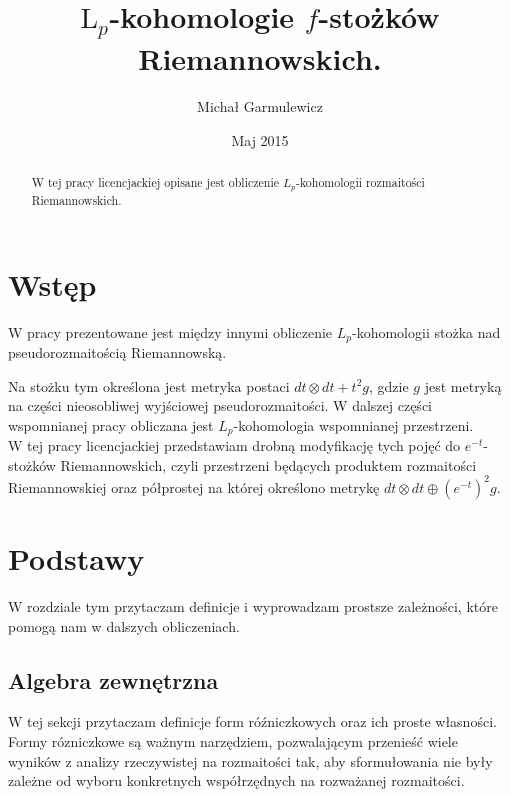 \documentclass[licencjacka]{pracamgr}
\author{Michał Garmulewicz}
\title{$\mathrm{L}_p$-kohomologie $f$-stożków Riemannowskich.}
\date{Maj 2015}
\theoremstyle{definition}
\theoremstyle{definition}
\theoremstyle{plain}
\theoremstyle{plain}
\begin{document}
\maketitle

\begin{abstract}
  W tej pracy licencjackiej opisane jest obliczenie $L_p$-kohomologii
  rozmaitości Riemannowskich.
\end{abstract}

\tableofcontents

\chapter{Wstęp}

W pracy \cite{weber} prezentowane jest między innymi obliczenie
$L_p$-kohomologii stożka nad pseudorozmaitością Riemannowską. 

Na stożku tym określona jest metryka postaci
$dt \otimes dt + t^2 g$, gdzie $g$ 
jest metryką na części nieosobliwej wyjściowej pseudorozmaitości.
W dalszej części wspomnianej pracy obliczana jest $L_p$-kohomologia
wspomnianej przestrzeni.
\\


W tej pracy licencjackiej przedstawiam drobną modyfikację tych pojęć do
$e^{-t}$-stożków Riemannowskich, czyli przestrzeni będących produktem
rozmaitości Riemannowskiej oraz półprostej na której określono metrykę
$dt \otimes dt \oplus (e^{-t})^2 g$. \\


\chapter{Podstawy}
W rozdziale tym przytaczam definicje i wyprowadzam prostsze zależności, które
pomogą nam w dalszych obliczeniach. \\


\section{Algebra zewnętrzna}
W tej sekcji przytaczam definicje form róźniczkowych oraz ich proste
własności. Formy rózniczkowe są ważnym narzędziem, pozwalającym
przenieść wiele wyników z analizy rzeczywistej na rozmaitości tak, aby
sformułowania nie były zależne od wyboru konkretnych współrzędnych na rozważanej
rozmaitości. \\
\end{document}
